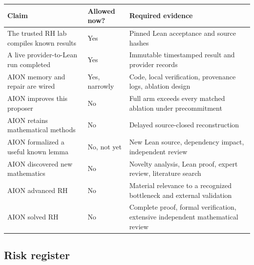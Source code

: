\documentclass[11pt,a4paper]{article}
\begin{document}
\begin{longtable}{p{45mm}p{30mm}p{80mm}}
\toprule
Claim & Allowed now? & Required evidence \\
\midrule
\endhead
The trusted RH lab compiles known results & Yes & Pinned Lean acceptance and source hashes \\
A live provider-to-Lean run completed & Yes & Immutable timestamped result and provider records \\
AION memory and repair are wired & Yes, narrowly & Code, local verification, provenance logs, ablation design \\
AION improves this proposer & No & Full arm exceeds every matched ablation under precommitment \\
AION retains mathematical methods & No & Delayed source-closed reconstruction \\
AION formalized a useful known lemma & No, not yet & New Lean source, dependency impact, independent review \\
AION discovered new mathematics & No & Novelty analysis, Lean proof, expert review, literature search \\
AION advanced RH & No & Material relevance to a recognized bottleneck and external validation \\
AION solved RH & No & Complete proof, formal verification, extensive independent mathematical review \\
\bottomrule
\end{longtable}

\subsection{Risk register}
\end{document}
